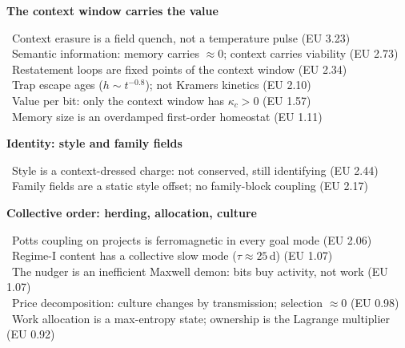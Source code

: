\begin{frame}
\vfill{\Large\bfseries The context window carries the value}\par\vspace{0.8em}
{\small
{}\ Context erasure is a field quench, not a temperature pulse {\color{muted}(EU 3.23)}\\[0.25em]
\ Semantic information: memory carries $\approx0$; context carries viability {\color{muted}(EU 2.73)}\\[0.25em]
\ Restatement loops are fixed points of the context window {\color{muted}(EU 2.34)}\\[0.25em]
\ Trap escape ages ($h\sim t^{-0.8}$); not Kramers kinetics {\color{muted}(EU 2.10)}\\[0.25em]
\ Value per bit: only the context window has $\kappa_c>0$ {\color{muted}(EU 1.57)}\\[0.25em]
\ Memory size is an overdamped first-order homeostat {\color{muted}(EU 1.11)}}
\vfill
\end{frame}






\begin{frame}
\vfill{\Large\bfseries Identity: style and family fields}\par\vspace{0.8em}
{\small
{}\ Style is a context-dressed charge: not conserved, still identifying {\color{muted}(EU 2.44)}\\[0.25em]
\ Family fields are a static style offset; no family-block coupling {\color{muted}(EU 2.17)}}
\vfill
\end{frame}


\begin{frame}
\vfill{\Large\bfseries Collective order: herding, allocation, culture}\par\vspace{0.8em}
{\small
{}\ Potts coupling on projects is ferromagnetic in every goal mode {\color{muted}(EU 2.06)}\\[0.25em]
\ Regime-I content has a collective slow mode ($\tau\approx25$\,d) {\color{muted}(EU 1.07)}\\[0.25em]
\ The nudger is an inefficient Maxwell demon: bits buy activity, not work {\color{muted}(EU 1.07)}\\[0.25em]
\ Price decomposition: culture changes by transmission; selection $\approx0$ {\color{muted}(EU 0.98)}\\[0.25em]
\ Work allocation is a max-entropy state; ownership is the Lagrange multiplier {\color{muted}(EU 0.92)}}
\vfill
\end{frame}





